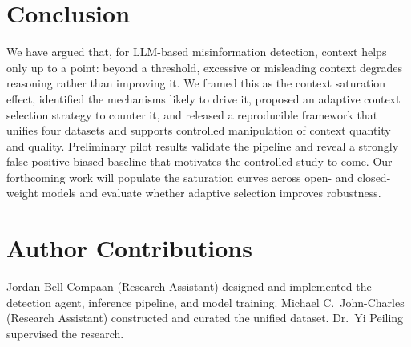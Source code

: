 \documentclass[11pt]{article}
\begin{document}
\section{Conclusion}
\label{sec:conclusion}

We have argued that, for LLM-based misinformation detection, context helps only up to a point: beyond a threshold, excessive or misleading context degrades reasoning rather than improving it. We framed this as the context saturation effect, identified the mechanisms likely to drive it, proposed an adaptive context selection strategy to counter it, and released a reproducible framework that unifies four datasets and supports controlled manipulation of context quantity and quality. Preliminary pilot results validate the pipeline and reveal a strongly false-positive-biased baseline that motivates the controlled study to come. Our forthcoming work will populate the saturation curves across open- and closed-weight models and evaluate whether adaptive selection improves robustness.

\section*{Author Contributions}
Jordan Bell Compaan (Research Assistant) designed and implemented the detection agent, inference pipeline, and model training. Michael C.\ John-Charles (Research Assistant) constructed and curated the unified dataset. Dr.\ Yi Peiling supervised the research.


\end{document}
